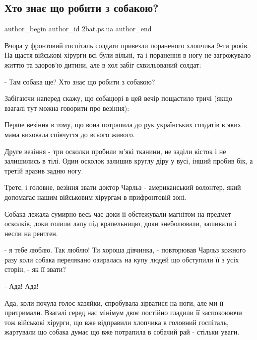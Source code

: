  
 
 
 
 
 
\subsection{Хто знає що робити з собакою?}
\label{sec:04_05_2022.fb.2bat.ps.ua.1.sobaka}
 
\ifcmt
 author_begin
   author_id 2bat.ps.ua
 author_end
\fi

Вчора у фронтовий госпіталь солдати привезли пораненого хлопчика 9-ти років. На
щастя військові хірурги всі були вільні, та і поранення в ногу не загрожувало
життю та здоров'ю дитини, але в хол забіг схвильований солдат:

- Там собака ще? Хто знає що робити з собакою?

Забігаючи наперед скажу, що собацюрі в цей вечір пощастило тричі (якщо взагалі
тут можна говорити про везіння): 

Перше везіння в тому, що вона потрапила до рук українських солдатів  в яких
мама  виховала  співчуття до всього живого. 

Друге везіння - три осколки пробили м'які тканини, не заділи кісток і не
залишились в тілі. Один осколок залишив круглу діру у вусі, інший пробив бік, а
третій вразив задню ногу. 

Третє, і головне, везіння звати доктор Чарльз - американський волонтер, який
допомагає нашим військовим хірургам в прифронтовій зоні. 

Собака лежала сумирно весь час доки її обстежували магнітом на предмет
осколків, доки голили лапу під крапельницю, доки знеболювали, зашивали і несли
на рентген. 

- я тебе люблю. Так люблю! Ти хороша дівчинка, - повторював Чарльз кожного разу
коли собака перелякано озиралась на купу людей що обступили її з усіх сторін, -
як її звати?

- Ада! Ада!

Ада, коли почула голос хазяйки,  спробувала зірватися на ноги, але ми її
притримали. Взагалі серед нас мінімум двоє постійно гладили її заспокоюючи тож
військові хірурги, що вже відправили хлопчика в головний госпіталь, жартували
що собака думає що вже потрапила в собачий рай - стільки уваги. 

